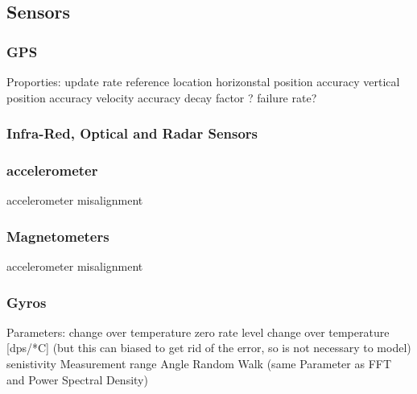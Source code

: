 \subsection{Sensors}
    \subsubsection{GPS}
        Proporties:
            update rate
            reference location
            horizonstal position accuracy
            vertical position accuracy
            velocity accuracy
            decay factor ?
            failure rate?

    \subsubsection{Infra-Red, Optical and Radar Sensors}


    \subsubsection{accelerometer}
        accelerometer misalignment

    \subsubsection{Magnetometers}
        accelerometer misalignment


    \subsubsection{Gyros}
        Parameters:
            change over temperature
            zero rate level change over temperature [dps/*C] (but this can biased to get rid of the error, so is not necessary to model)
            senistivity
            Measurement range
            Angle Random Walk (same Parameter as FFT and Power Spectral Density)

